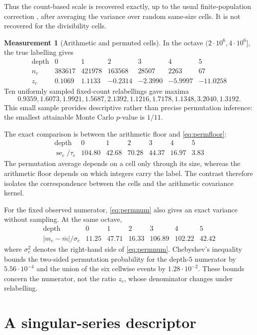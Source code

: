 \documentclass[11pt,a4paper]{article}
\theoremstyle{plain}
\theoremstyle{definition}
\newtheorem{measurement}[theorem]{Measurement}
\theoremstyle{remark}
\begin{document}
Thus the count-based scale is recovered exactly, up to the usual
finite-population correction \cite{Cochran}, after averaging the
variance over random same-size cells.  It is not recovered for the
divisibility cells.

\begin{measurement}[Arithmetic and permuted cells]\label{meas:placebo}
In the octave $(2\cdot10^6,4\cdot10^6]$, the true labelling gives
\[
\begin{array}{r|cccccc}
 \text{depth}&0&1&2&3&4&5\\
 n_c&383617&421978&163568&28507&2263&67\\\hline
 z_c&0.1069&1.1133&-0.2314&-2.3990&-5.9997&-11.0258
\end{array}
\]
Ten uniformly sampled fixed-count relabellings gave maxima
\[
 0.9359,1.6073,1.9921,1.5687,2.1392,
 1.1216,1.7178,1.1348,3.2040,1.3192.
\]
This small sample provides descriptive rather than precise permutation
inference: the smallest attainable Monte Carlo $p$-value is $1/11$.

The exact comparison is between the arithmetic floor and
\eqref{eq:permfloor}:
\[
\begin{array}{r|cccccc}
 \text{depth}&0&1&2&3&4&5\\\hline
 \operatorname{se}_c/\tau_c&104.80&42.68&70.28&44.37&16.97&3.83
\end{array}
\]
The permutation average depends on a cell only through its size, whereas
the arithmetic floor depends on which integers carry the label.  The
contrast therefore isolates the correspondence between the cells and
the arithmetic covariance kernel.
\end{measurement}

For the fixed observed numerator, \eqref{eq:permnum} also gives an exact
variance without sampling.  At the same octave,
\[
\begin{array}{r|cccccc}
 \text{depth}&0&1&2&3&4&5\\\hline
 |m_c-\overline m|/\sigma_c&11.25&47.71&16.33&106.89&102.22&42.42
\end{array}
\]
where $\sigma_c^2$ denotes the right-hand side of
\eqref{eq:permnum}.  Chebyshev's inequality bounds the two-sided
permutation probability for the depth-$5$ numerator by
$5.56\cdot10^{-4}$ and the union of the six cellwise events by
$1.28\cdot10^{-2}$.  These bounds concern the numerator, not the ratio
$z_c$, whose denominator changes under relabelling.

\section{A singular-series descriptor}\label{sec:descriptor}
\end{document}
